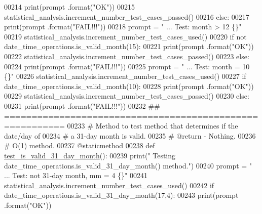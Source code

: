 \begin{DoxyCode}
00214             print(prompt .format(\textcolor{stringliteral}{"OK"}))
00215             statistical\_analysis.increment\_number\_test\_cases\_passed()
00216         \textcolor{keywordflow}{else}:
00217             print(prompt .format(\textcolor{stringliteral}{"FAIL!!!"}))
00218         prompt = \textcolor{stringliteral}{"  ... Test: month > 12                    \{\}"}
00219         statistical\_analysis.increment\_number\_test\_cases\_used()
00220         \textcolor{keywordflow}{if} \textcolor{keywordflow}{not} date\_time\_operations.is\_valid\_month(15):
00221             print(prompt .format(\textcolor{stringliteral}{"OK"}))
00222             statistical\_analysis.increment\_number\_test\_cases\_passed()
00223         \textcolor{keywordflow}{else}:
00224             print(prompt .format(\textcolor{stringliteral}{"FAIL!!!"}))
00225         prompt = \textcolor{stringliteral}{"  ... Test: month = 10                    \{\}"}
00226         statistical\_analysis.increment\_number\_test\_cases\_used()
00227         \textcolor{keywordflow}{if} date\_time\_operations.is\_valid\_month(10):
00228             print(prompt .format(\textcolor{stringliteral}{"OK"}))
00229             statistical\_analysis.increment\_number\_test\_cases\_passed()
00230         \textcolor{keywordflow}{else}:
00231             print(prompt .format(\textcolor{stringliteral}{"FAIL!!!"}))
00232     \textcolor{comment}{## =========================================================}
00233     \textcolor{comment}{#   Method to test method that determines if the date/day of}
00234     \textcolor{comment}{#       a 31-day month is valid.}
00235     \textcolor{comment}{#   @return - Nothing.}
00236     \textcolor{comment}{#   O(1) method.}
00237     @staticmethod
\hypertarget{date__time__processing__tester_8py_source_l00238}{}\hyperlink{classutilities_1_1date__time__processing__tester_1_1date__time__operations__tester_a6ee9fbb6e07f1ca66334315e61876d8e}{00238}     \textcolor{keyword}{def }\hyperlink{classutilities_1_1date__time__processing__tester_1_1date__time__operations__tester_a6ee9fbb6e07f1ca66334315e61876d8e}{test\_is\_valid\_31\_day\_month}():
00239         print(\textcolor{stringliteral}{" Testing date\_time\_operations.is\_valid\_31\_day\_month() method."})
00240         prompt = \textcolor{stringliteral}{"  ... Test: not 31-day month, mm = 4          \{\}"}
00241         statistical\_analysis.increment\_number\_test\_cases\_used()
00242         \textcolor{keywordflow}{if} date\_time\_operations.is\_valid\_31\_day\_month(17,4):
00243             print(prompt .format(\textcolor{stringliteral}{"OK"}))

\end{DoxyCode}
